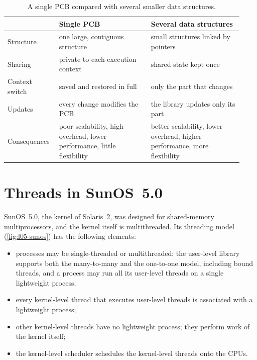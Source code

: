 \documentclass[../main.tex]{subfiles}
\begin{document}
\begin{table}[htbp]
  \centering
  \caption{A single PCB compared with several smaller data structures.}
  \label{tab:l05-rationale}
  \small
  \begin{tabular}{@{}>{\raggedright\arraybackslash}p{0.19\linewidth}>{\raggedright\arraybackslash}p{0.37\linewidth}>{\raggedright\arraybackslash}p{0.37\linewidth}@{}}
    \toprule
    & Single PCB & Several data structures \\
    \midrule
    Structure      & one large, contiguous structure
                   & small structures linked by pointers \\
    Sharing        & private to each execution context
                   & shared state kept once \\
    Context switch & saved and restored in full
                   & only the part that changes \\
    Updates        & every change modifies the PCB
                   & the library updates only its part \\
    \midrule
    Consequences   & poor scalability, high overhead, lower performance,
                     little flexibility
                   & better scalability, lower overhead, higher
                     performance, more flexibility \\
    \bottomrule
  \end{tabular}
\end{table}

\section{Threads in SunOS~5.0}
\label{sec:l05-solaris}

SunOS~5.0, the kernel of Solaris~2, was designed for shared-memory
multiprocessors, and the kernel itself is multithreaded.  Its threading model (\cref{fig:l05-sunos}) has the
following elements:
\begin{itemize}
  \item processes may be single-threaded or multithreaded; the user-level
    library supports both the many-to-many and the one-to-one model,
    including bound threads, and a process may run all its user-level
    threads on a single lightweight process;
  \item every kernel-level thread that executes user-level threads is
    associated with a lightweight process;
  \item other kernel-level threads have no lightweight process; they
    perform work of the kernel itself;
  \item the kernel-level scheduler schedules the kernel-level threads onto
    the CPUs.
\end{itemize}
\end{document}

